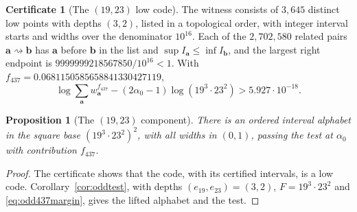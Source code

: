 \documentclass[11pt]{article}
\newtheorem{proposition}[theorem]{Proposition}
\theoremstyle{definition}
\newtheorem{certificate}[theorem]{Certificate}
\theoremstyle{remark}
\newcommand{\al}{\alpha_0}
\newcommand{\sto}{\rightsquigarrow}
\begin{document}
\begin{certificate}[The $(19,23)$ low code]\label{cert:odd437}
The witness consists of $3{,}645$ distinct low points with depths $(3,2)$,
listed in a topological order, with integer interval starts and widths over
the denominator $10^{16}$. Each of the $2{,}702{,}580$ related pairs
$\mathbf a\sto\mathbf b$ has $\mathbf a$ before $\mathbf b$ in the list and
$\sup I_{\mathbf a}\le\inf I_{\mathbf b}$, and the largest right endpoint is
$9999999218567850/10^{16}<1$. With $f_{437}=0.0681150585658841330427119$,
\begin{equation}\label{eq:odd437margin}
 \log\sum_{\mathbf a}w_{\mathbf a}^{f_{437}}-(2\al-1)\log(19^3\cdot23^2)>5.927\cdot10^{-18}.
\end{equation}
\end{certificate}

\begin{proposition}[The $(19,23)$ component]\label{prop:odd437}
There is an ordered interval alphabet in the square base $(19^3\cdot23^2)^2$,
with all widths in $(0,1)$, passing the test at $\al$ with contribution
$f_{437}$.
\end{proposition}
\begin{proof}
The certificate shows that the code, with its certified intervals, is a low
code. Corollary~\ref{cor:oddtest}, with depths $(e_{19},e_{23})=(3,2)$,
$F=19^3\cdot23^2$ and \eqref{eq:odd437margin}, gives the lifted alphabet and
the test.
\end{proof}
\end{document}
